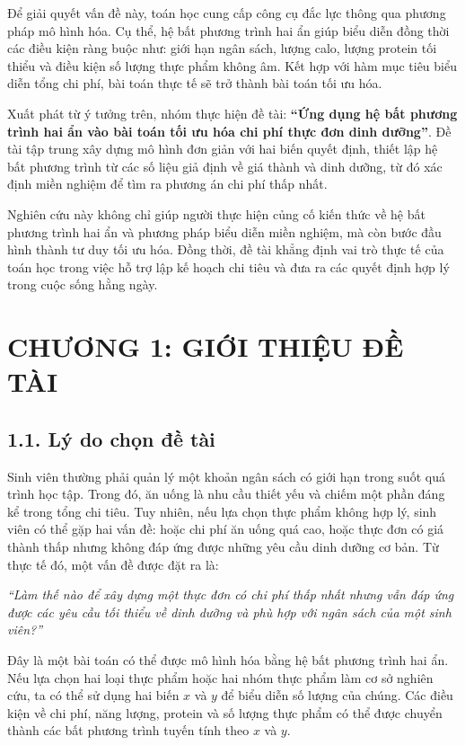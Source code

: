 \documentclass[12pt,a4paper]{article}
\begin{document}
Để giải quyết vấn đề này, toán học cung cấp công cụ đắc lực thông qua phương pháp mô hình hóa. Cụ thể, hệ bất phương trình hai ẩn giúp biểu diễn đồng thời các điều kiện ràng buộc như: giới hạn ngân sách, lượng calo, lượng protein tối thiểu và điều kiện số lượng thực phẩm không âm. Kết hợp với hàm mục tiêu biểu diễn tổng chi phí, bài toán thực tế sẽ trở thành bài toán tối ưu hóa.

Xuất phát từ ý tưởng trên, nhóm thực hiện đề tài:
\textbf{``Ứng dụng hệ bất phương trình hai ẩn vào bài toán tối ưu hóa chi phí thực đơn dinh dưỡng''}. 
Đề tài tập trung xây dựng mô hình đơn giản với hai biến quyết định, thiết lập hệ bất phương trình từ các số liệu giả định về giá thành và dinh dưỡng, từ đó xác định miền nghiệm để tìm ra phương án chi phí thấp nhất.

Nghiên cứu này không chỉ giúp người thực hiện củng cố kiến thức về hệ bất phương trình hai ẩn và phương pháp biểu diễn miền nghiệm, mà còn bước đầu hình thành tư duy tối ưu hóa. Đồng thời, đề tài khẳng định vai trò thực tế của toán học trong việc hỗ trợ lập kế hoạch chi tiêu và đưa ra các quyết định hợp lý trong cuộc sống hằng ngày.



\newpage

\section*{CHƯƠNG 1: GIỚI THIỆU ĐỀ TÀI}


\subsection*{1.1. Lý do chọn đề tài}

Sinh viên thường phải quản lý một khoản ngân sách có giới hạn trong suốt quá trình học tập. Trong đó, ăn uống là nhu cầu thiết yếu và chiếm một phần đáng kể trong tổng chi tiêu. Tuy nhiên, nếu lựa chọn thực phẩm không hợp lý, sinh viên có thể gặp hai vấn đề: hoặc chi phí ăn uống quá cao, hoặc thực đơn có giá thành thấp nhưng không đáp ứng được những yêu cầu dinh dưỡng cơ bản.
Từ thực tế đó, một vấn đề được đặt ra là:
\begin{center}
\textit{``Làm thế nào để xây dựng một thực đơn có chi phí thấp nhất nhưng vẫn đáp ứng được các yêu cầu tối thiểu về dinh dưỡng và phù hợp với ngân sách của một sinh viên?''}
\end{center}
Đây là một bài toán có thể được mô hình hóa bằng hệ bất phương trình hai ẩn. Nếu lựa chọn hai loại thực phẩm hoặc hai nhóm thực phẩm làm cơ sở nghiên cứu, ta có thể sử dụng hai biến $x$ và $y$ để biểu diễn số lượng của chúng. Các điều kiện về chi phí, năng lượng, protein và số lượng thực phẩm có thể được chuyển thành các bất phương trình tuyến tính theo $x$ và $y$.
\end{document}

